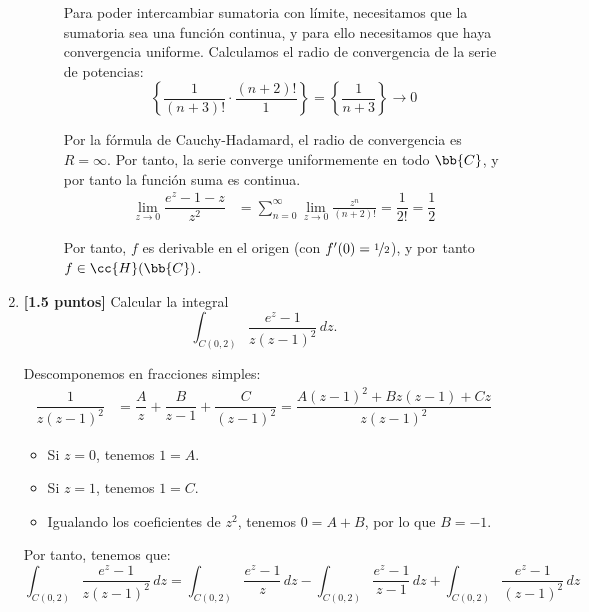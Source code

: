 \documentclass[12pt]{article}
\begin{document}
\begin{ejercicio}
\begin{enumerate}
\begin{description}
                Para poder intercambiar sumatoria con límite, necesitamos que la sumatoria sea una función continua, y para ello necesitamos que haya convergencia uniforme. Calculamos el radio de convergencia de la serie de potencias:
                \begin{equation*}
                    \left\{\frac{1}{(n+3)!}\cdot \dfrac{(n+2)!}{1}\right\} = \left\{\frac{1}{n+3}\right\} \to 0
                \end{equation*}

                Por la fórmula de Cauchy-Hadamard, el radio de convergencia es $R=\infty$. Por tanto, la serie converge uniformemente en todo $\bb{C}$, y por tanto la función suma es continua.
                \begin{align*}
                    \lim_{z\to 0} \dfrac{e^z-1-z}{z^2} &= \sum\limits_{n=0}^{\infty}\lim_{z\to 0} \frac{z^n}{(n+2)!} = \dfrac{1}{2!} = \dfrac{1}{2}
                \end{align*}

                Por tanto, $f$ es derivable en el origen (con $f'(0)=\nicefrac{1}{2}$), y por tanto $f\in \cc{H}(\bb{C})$.
            \end{description}

            \item \textbf{[1.5 puntos]} Calcular la integral
            \begin{equation*}
                \int_{C(0,2)} \frac{e^z-1}{z(z - 1)^2} \, dz.
            \end{equation*}
            
            Descomponemos en fracciones simples:
            \begin{align*}
                \dfrac{1}{z(z-1)^2} &= \dfrac{A}{z} + \dfrac{B}{z-1} + \dfrac{C}{(z-1)^2} = \dfrac{A(z-1)^2 + Bz(z-1) + Cz}{z(z-1)^2}
            \end{align*}
            \begin{itemize}
                \item Si $z=0$, tenemos $1=A$.
                \item Si $z=1$, tenemos $1=C$.
                \item Igualando los coeficientes de $z^2$, tenemos $0=A+B$, por lo que $B=-1$.
            \end{itemize}

            Por tanto, tenemos que:
            \begin{equation*}
                \int_{C(0,2)} \frac{e^z-1}{z(z - 1)^2} \, dz = \int_{C(0,2)} \dfrac{e^z-1}{z} \, dz - \int_{C(0,2)} \dfrac{e^z-1}{z-1} \, dz + \int_{C(0,2)} \dfrac{e^z-1}{(z-1)^2} \, dz
            \end{equation*}


\end{enumerate}
\end{ejercicio}
\end{document}

